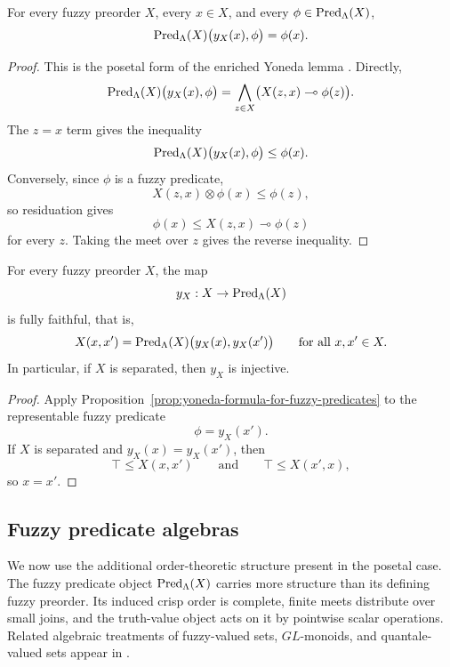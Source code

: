 \begin{proposition}
\label{prop:yoneda-formula-for-fuzzy-predicates}
    For every fuzzy preorder \(X\), every \(x\in X\), and every \(\phi\in \mathrm{Pred}_\Lambda(X)\),
    \[
        \mathrm{Pred}_\Lambda(X)\bigl(y_X(x),\phi\bigr)=\phi(x).
    \]
\end{proposition}

\begin{proof}
    This is the posetal form of the enriched Yoneda lemma \cite[Section~1.9]{Kelly1982BasicConcepts}. Directly,
    \[
        \mathrm{Pred}_\Lambda(X)\bigl(y_X(x),\phi\bigr)
        =
        \bigwedge_{z\in X}\bigl(X(z,x)\multimap \phi(z)\bigr).
    \]
    The \(z=x\) term gives the inequality
    \[
        \mathrm{Pred}_\Lambda(X)\bigl(y_X(x),\phi\bigr)\leq\phi(x).
    \]
    Conversely, since \(\phi\) is a fuzzy predicate,
    \[
        X(z,x)\otimes \phi(x)\leq \phi(z),
    \]
    so residuation gives
    \[
        \phi(x)\leq X(z,x)\multimap \phi(z)
    \]
    for every \(z\). Taking the meet over \(z\) gives the reverse inequality.
\end{proof}

\begin{corollary}
\label{cor:yoneda-embedding-fully-faithful}
    For every fuzzy preorder \(X\), the map
    \[
        y_X:X\to \mathrm{Pred}_\Lambda(X)
    \]
    is fully faithful, that is,
    \[
        X(x,x')
        =
        \mathrm{Pred}_\Lambda(X)\bigl(y_X(x),y_X(x')\bigr)
        \qquad
        \text{for all }x,x'\in X.
    \]
    In particular, if \(X\) is separated, then \(y_X\) is injective.
\end{corollary}

\begin{proof}
    Apply Proposition~\ref{prop:yoneda-formula-for-fuzzy-predicates} to the representable fuzzy predicate
    \[
        \phi=y_X(x').
    \]
    If \(X\) is separated and \(y_X(x)=y_X(x')\), then
    \[
        \top\leq X(x,x')
        \qquad\text{and}\qquad
        \top\leq X(x',x),
    \]
    so \(x=x'\).
\end{proof}

\subsection{Fuzzy predicate algebras}
\label{subsec:fuzzy-predicate-algebras}

We now use the additional order-theoretic structure present in the posetal case. The fuzzy predicate object \(\mathrm{Pred}_\Lambda(X)\) carries more structure than its defining fuzzy preorder. Its induced crisp order is complete, finite meets distribute over small joins, and the truth-value object acts on it by pointwise scalar operations. Related algebraic treatments of fuzzy-valued sets, \(GL\)-monoids, and quantale-valued sets appear in \cite{Hohle1992MValuedSetsSheaves,Hohle1995PresheavesGLMonoids,Hohle1998GLQuantales,HohleKubiak2011QuantaleSets}.

